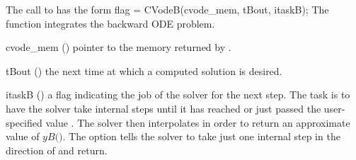 The call to  has the form
{
  flag = CVodeB(cvode\_mem, tBout, itaskB);
}
{
  The function  integrates the backward ODE problem.
}
{
  \begin{args}
  \item[cvode\_mem] ()
    pointer to the {\cvodes} memory returned by .
  \item[tBout] ()
    the next time at which a computed solution is desired.
  \item[itaskB] ()
    a flag indicating the job of the solver for the next step. 
    The  task is to have the solver take internal steps until   
    it has reached or just passed the user-specified value .
    The solver then interpolates in order to   
    return an approximate value of $yB($$)$. 
    The  option tells the solver to take just one internal step in
    the direction of  and return. 
  \end{args}
}
